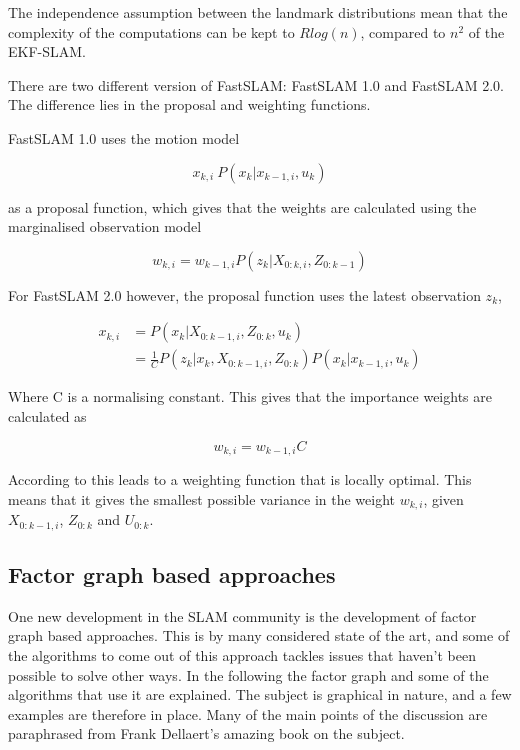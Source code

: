 The independence assumption between the landmark distributions mean that the complexity of the computations can be kept to $Rlog(n)$, compared to $n^2$ of the EKF-SLAM. 

There are two different version of FastSLAM: FastSLAM 1.0\cite{FastSLAM1} and FastSLAM 2.0\cite{FastSLAM2}. The difference lies in the proposal and weighting functions. 

FastSLAM 1.0 uses the motion model 

\begin{equation}
    x_{k,i} ~ P(x_k|x_{k-1,i},u_k)
\end{equation}

as a proposal function, which gives that the weights are calculated using the marginalised observation model

\begin{equation}
    w_{k,i} = w_{k-1,i}P(z_k|X_{0:k,i},Z_{0:k-1})
\end{equation}

For FastSLAM 2.0 however, the proposal function uses the latest observation $z_k$,

\begin{align}
    x_{k,i} &= P(x_k|X_{0:k-1,i},Z_{0:k},u_k) \\
    &= \frac{1}{C}P(z_k|x_k,X_{0:k-1,i},Z_{0:k})P(x_k|x_{k-1,i},u_k)
\end{align}

Where C is a normalising constant. This gives that the importance weights are calculated as

\begin{equation}
    w_{k,i} = w_{k-1,i}C
\end{equation}

According to \cite{SLAMIntro} this leads to a weighting function that is locally optimal. This means that it gives the smallest possible variance in the weight $w_{k,i}$, given $X_{0:k-1,i}$, $Z_{0:k}$ and $U_{0:k}$.


\subsection{Factor graph based approaches}

One new development in the SLAM community is the development of factor graph based approaches. This is by many considered state of the art, and some of the algorithms to come out of this approach tackles issues that haven't been possible to solve other ways. In the following the factor graph and some of the algorithms that use it are explained. The subject is graphical in nature, and a few examples are therefore in place. Many of the main points of the discussion are paraphrased from Frank Dellaert's amazing book on the subject\cite{Dellaert}.

